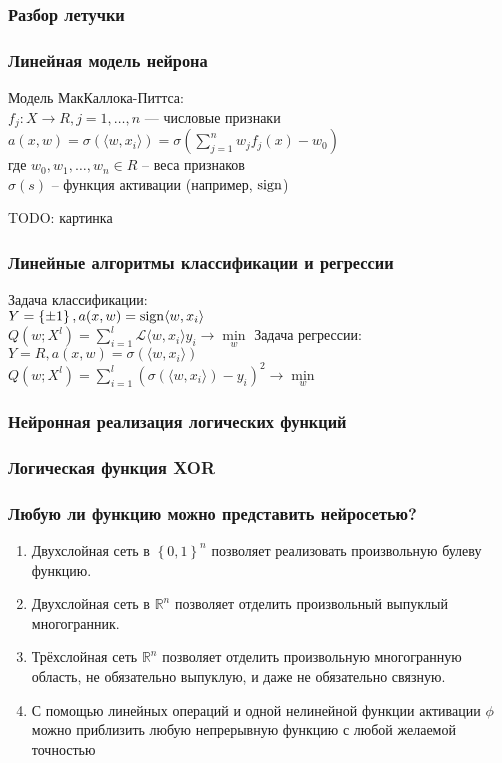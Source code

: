 \documentclass[12pt]{beamer}
\subtitle{Лекция 11. Нейронные сети.}
\begin{document}
	
\frame{\titlepage}

\begin{frame}\frametitle{Разбор летучки}

\end{frame}

\begin{frame}\frametitle{Линейная модель нейрона}
Модель МакКаллока-Питтса:\\
$f_j: X \rightarrow R, j = 1,\dots, n$ — числовые признаки\\
$a(x,w) = \sigma(\langle w, x_i \rangle) = \sigma(\sum\limits_{j=1}^n w_j f_j(x) - w_0)$\\
где $w_0, w_1, \dots,w_n \in R$ -- веса признаков\\
$\sigma(s)$ -- функция активации (например, $\operatorname{sign}$)

TODO: картинка
\end{frame}

\begin{frame}\frametitle{Линейные алгоритмы классификации и регрессии}
Задача классификации: \\
$Y = \left\{ \pm1 \right\}, a(x,w) = \operatorname{sign} \langle w, x_i \rangle $\\
$Q(w;X^l) = \sum\limits_{i=1}^l \mathcal{L} \langle w, x_i\rangle y_i \rightarrow \min\limits_w$
Задача регрессии:\\
$Y = R, a(x,w) = \sigma(\langle w, x_i \rangle)$\\
$Q(w;X^l) = \sum\limits_{i=1}^l (\sigma(\langle w, x_i \rangle) - y_i)^2 \rightarrow \min\limits_w $
\end{frame}

\begin{frame}\frametitle{Нейронная реализация логических функций}

\end{frame}


\begin{frame}\frametitle{Логическая функция XOR}

\end{frame}


\begin{frame}\frametitle{Любую ли функцию можно представить нейросетью?}
\begin{enumerate}[--]
\item Двухслойная сеть в $\left\{0, 1 \right\}^n$ позволяет реализовать произвольную булеву функцию.
\item Двухслойная сеть в $\mathbb{R}^n$ позволяет отделить произвольный выпуклый многогранник.
\item Трёхслойная сеть $\mathbb{R}^n$ позволяет отделить произвольную многогранную область, не обязательно выпуклую, и даже не обязательно связную.
\item С помощью линейных операций и одной нелинейной функции активации $\phi$ можно приблизить любую непрерывную функцию с любой желаемой точностью
\end{enumerate}
\end{frame}
\end{document}
